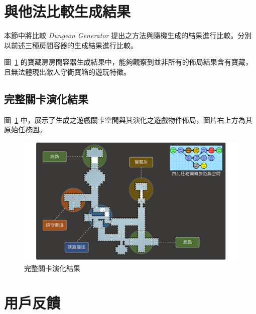 \clearpage

\section{與他法比較生成結果}
\label{sec:experiment-comparison}

本節中將比較 \textit{Dungeon Generator} 提出之方法與隨機生成的結果進行比較。分別以前述三種房間容器的生成結果進行比較。


圖~\ref{fig:experiment-overall-evolution} 的寶藏房房間容器生成結果中，能夠觀察到並非所有的佈局結果含有寶藏，且無法體現出敵人守衛寶箱的遊玩特徵。


\begin{landscape}
  \section{完整關卡演化結果}
  \label{sec:experiment-overall}

  圖~\ref{fig:experiment-overall-evolution} 中，展示了生成之遊戲關卡空間與其演化之遊戲物件佈局，圖片右上方為其原始任務圖。

  \begin{figure}[H]
    \begin{center}
      \includegraphics[width=0.72\linewidth]{figures/experiments/experiment-overall-evolution.pdf}
      \caption{完整關卡演化結果}
      \label{fig:experiment-overall-evolution}
    \end{center}
  \end{figure}
\end{landscape}

\section{用戶反饋}
\label{sec:experiment-*----*--}



